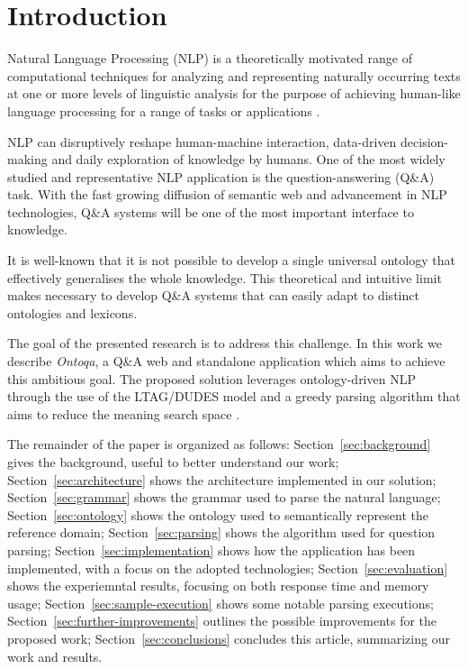 \section{Introduction}
\label{sec:introduction}

Natural Language Processing (NLP) is a theoretically motivated range of
computational techniques for analyzing and representing naturally occurring texts
at one or more levels of linguistic analysis for the purpose of achieving human-like
language processing for a range of tasks or applications \cite{liddy2001natural}.

NLP can disruptively reshape human-machine interaction, data-driven decision-making and daily exploration of knowledge by humans.
%
One of the most widely studied and representative NLP application is the question-answering (Q\&A) task.
%
With the fast growing diffusion of semantic web and advancement in NLP technologies, Q\&A systems will be one of the most important interface to knowledge.

It is well-known that it is not possible to develop a single universal ontology that effectively generalises the whole knowledge.
%
This theoretical and intuitive limit makes necessary to develop Q\&A systems that can easily adapt to distinct ontologies and lexicons.

The goal of the presented research is to address this  challenge.
In this work we describe \textit{Ontoqa}, a Q\&A web and standalone application which aims to achieve this ambitious goal.
The proposed solution leverages ontology-driven NLP through the use of the LTAG/DUDES model and a greedy parsing algorithm that aims to reduce the meaning search space \cite{cimiano2014ontology}.


The remainder of the paper is organized as follows:
Section~\ref{sec:background} gives the background, useful to better understand our work;
Section~\ref{sec:architecture} shows the architecture implemented in our solution;
Section~\ref{sec:grammar} shows the grammar used to parse the natural language;
Section~\ref{sec:ontology} shows the ontology used to semantically represent the reference domain;
Section~\ref{sec:parsing} shows the algorithm used for question parsing;
Section~\ref{sec:implementation} shows how the application has been implemented, with a focus on the adopted technologies;
Section~\ref{sec:evaluation} shows the experiemntal results, focusing on both response time and memory usage;
Section~\ref{sec:sample-execution} shows some notable parsing executions;
Section~\ref{sec:further-improvements} outlines the possible improvements for the proposed work;
Section~\ref{sec:conclusions} concludes this article, summarizing our work and results.